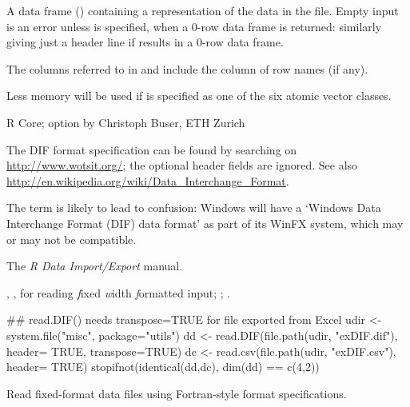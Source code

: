 %
\begin{Value}
A data frame () containing a representation of
the data in the file.  Empty input is an error unless 
is specified, when a 0-row data frame is returned: similarly giving
just a header line if  results in a 0-row data frame.
\end{Value}
%
\begin{Note}\relax
The columns referred to in  and  include
the column of row names (if any).

Less memory will be used if  is specified as one of
the six atomic vector classes.
\end{Note}
%
\begin{Author}\relax
R Core;  option by
Christoph Buser, ETH Zurich
\end{Author}
%
\begin{References}\relax
The DIF format specification can be found by searching on
\url{http://www.wotsit.org/}; the optional header fields are ignored.
See also
\url{http://en.wikipedia.org/wiki/Data_Interchange_Format}.

The term is likely to lead to confusion: Windows will have a
`Windows Data Interchange Format (DIF) data format' as part of
its WinFX system, which may or may not be compatible.
\end{References}
%
\begin{SeeAlso}\relax
The \emph{R Data Import/Export} manual.

, ,
 for reading \emph{f}ixed \emph{w}idth
\emph{f}ormatted input;
;
.
\end{SeeAlso}
%
\begin{Examples}
\begin{ExampleCode}
## read.DIF() needs transpose=TRUE for file exported from Excel
udir <- system.file("misc", package="utils")
dd <- read.DIF(file.path(udir, "exDIF.dif"), header= TRUE, transpose=TRUE)
dc <- read.csv(file.path(udir, "exDIF.csv"), header= TRUE)
stopifnot(identical(dd,dc), dim(dd) == c(4,2))
\end{ExampleCode}
\end{Examples}
%
\begin{Description}\relax
Read fixed-format data files using Fortran-style format specifications.
\end{Description}
